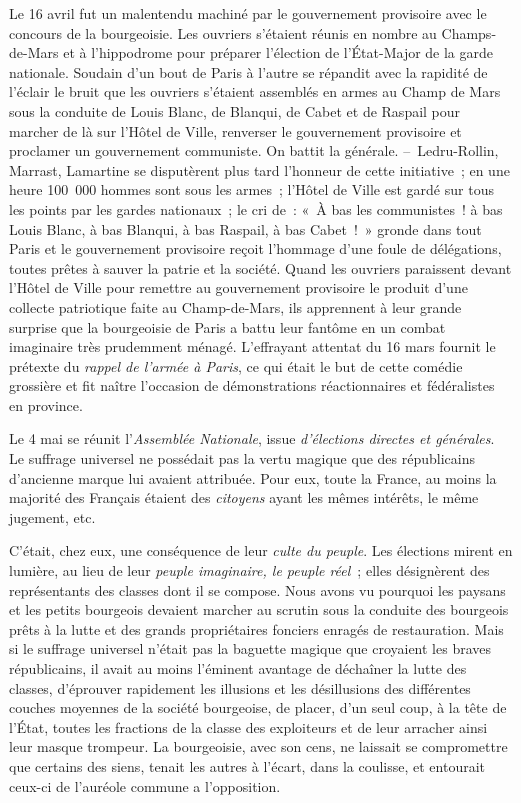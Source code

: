 \documentclass[french,twoside]{book} %
\begin{document}
Le 16 avril fut un malentendu machiné par le gouvernement provisoire avec le concours de la bourgeoisie. Les ouvriers s’étaient réunis en nombre au Champs-de-Mars et à l’hippodrome pour préparer l’élection de l’État-Major de la garde nationale. Soudain d’un bout de Paris à l’autre se répandit avec la rapidité de l’éclair le bruit que les ouvriers s’étaient assemblés en armes au Champ de Mars sous la conduite de Louis Blanc, de Blanqui, de Cabet et de Raspail pour marcher de là sur l’Hôtel de Ville, renverser le gouvernement provisoire et proclamer un gouvernement communiste. On battit la générale. – Ledru-Rollin, Marrast, Lamartine se disputèrent plus tard l’honneur de cette initiative ; en une heure 100 000 hommes sont sous les armes ; l’Hôtel de Ville est gardé sur tous les points par les gardes nationaux ; le cri de : « À bas les communistes ! à bas Louis Blanc, à bas Blanqui, à bas Raspail, à bas Cabet ! » gronde dans tout Paris et le gouvernement provisoire reçoit l’hommage d’une foule de délégations, toutes prêtes à sauver la patrie et la société. Quand les ouvriers paraissent devant l’Hôtel de Ville pour remettre au gouvernement provisoire le produit d’une collecte patriotique faite au Champ-de-Mars, ils apprennent à leur grande surprise que la bourgeoisie de Paris a battu leur fantôme en un combat imaginaire très prudemment ménagé. L’effrayant attentat du 16 mars fournit le prétexte du \emph{rappel de l’armée à Paris}, ce qui était le but de cette comédie grossière et fit naître l’occasion de démonstrations réactionnaires et fédéralistes en province.\par
Le 4 mai se réunit l’\emph{Assemblée Nationale}, issue \emph{d’élections directes et générales}. Le suffrage universel ne possédait pas la vertu magique que des républicains d’ancienne marque lui avaient attribuée. Pour eux, toute la France, au moins la majorité des Français étaient des \emph{citoyens} ayant les mêmes intérêts, le même jugement, etc.\par
C’était, chez eux, une conséquence de leur \emph{culte du peuple}. Les élections mirent en lumière, au lieu de leur \emph{peuple imaginaire, le peuple réel} ; elles désignèrent des représentants des classes dont il se compose. Nous avons vu pourquoi les paysans et les petits bourgeois devaient marcher au scrutin sous la conduite des bourgeois prêts à la lutte et des grands propriétaires fonciers enragés de restauration. Mais si le suffrage universel n’était pas la baguette magique que croyaient les braves républicains, il avait au moins l’éminent avantage de déchaîner la lutte des classes, d’éprouver rapidement les illusions et les désillusions des différentes couches moyennes de la société bourgeoise, de placer, d’un seul coup, à la tête de l’État, toutes les fractions de la classe des exploiteurs et de leur arracher ainsi leur masque trompeur. La bourgeoisie, avec son cens, ne laissait se compromettre que certains des siens, tenait les autres à l’écart, dans la coulisse, et entourait ceux-ci de l’auréole commune a l’opposition.\par
\end{document}
